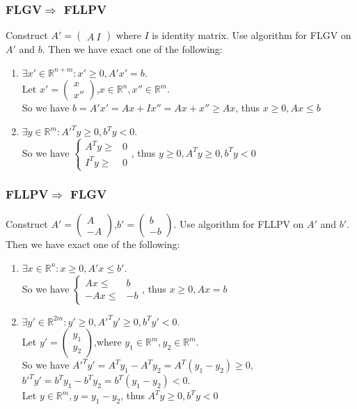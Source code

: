 	\subsubsection*{FLGV$\Rightarrow$ FLLPV}
	Construct \boldmath $A'=
	\begin{pmatrix}
	A\ I
	\end{pmatrix}$ where $I$ is identity matrix. Use algorithm for FLGV on $A'$ and $b$. Then we have exact one of the following:
	\begin{enumerate}
		\item $\exists x'\in \mathbb{R}^{n+m}:x'\geq 0,A'x'=b$.\\ Let $x'=\begin{pmatrix}
		x\\x''
		\end{pmatrix}$,$x\in \mathbb{R}^n,x''\in \mathbb{R}^m$.\\ So we have $b=A'x'=Ax+Ix''=Ax+x''\geq Ax$, thus $x\geq 0,Ax\leq b$
		\item $\exists y\in \mathbb{R}^{m}:A'^Ty\geq 0,b^Ty<0$.\\ So we have $\left\{\begin{aligned}
		A^Ty\geq& 0\\
		I^Ty\geq& 0
		\end{aligned}\right.$, thus $y\geq0,A^Ty\geq 0,b^Ty<0$
	\end{enumerate}
	\subsubsection*{FLLPV$\Rightarrow$ FLGV}
	Construct \boldmath $A'=
	\begin{pmatrix}
	A\\ -A
	\end{pmatrix}$,$b'=\begin{pmatrix}
	b\\ -b
	\end{pmatrix}$. Use algorithm for FLLPV on $A'$ and $b'$. Then we have exact one of the following:
	\begin{enumerate}
		\item $\exists x\in \mathbb{R}^n:x\geq 0,A'x\leq b'$.\\ So we have $\left\{\begin{aligned}
		Ax\leq& b\\
		-Ax\leq& -b
		\end{aligned}\right.$, thus $x\geq 0,Ax=b$
		\item $\exists y'\in \mathbb{R}^{2m}:y'\geq 0,A'^Ty'\geq 0,b^Ty'<0$.\\ Let $y'=\begin{pmatrix}
		y_1\\ y_2
		\end{pmatrix}$,where $y_1\in \mathbb{R}^m,y_2\in \mathbb{R}^m$.\\ So we have $A'^Ty'=A^Ty_1-A^Ty_2=A^T(y_1-y_2)\geq 0$, $b'^Ty'=b^Ty_1-b^Ty_2=b^T(y_1-y_2)<0$.\\ Let $y\in \mathbb{R}^m,y=y_1-y_2$, thus $A^Ty\geq 0,b^Ty<0$
	\end{enumerate}
